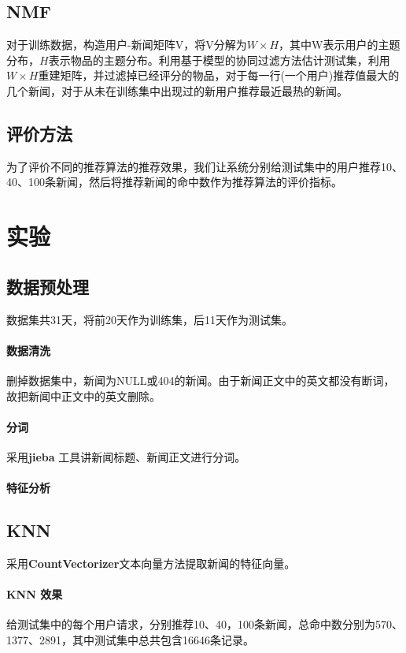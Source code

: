 \documentclass[UTF8]{article}
\begin{document}
\subsection{NMF}
对于训练数据，构造用户-新闻矩阵V，将V分解为$W\times H$，其中W表示用户的主题分布，$H$表示物品的主题分布。利用基于模型的协同过滤方法估计测试集，利用$W\times H$重建矩阵，并过滤掉已经评分的物品，对于每一行(一个用户)推荐值最大的几个新闻，对于从未在训练集中出现过的新用户推荐最近最热的新闻。

\subsection{评价方法}
为了评价不同的推荐算法的推荐效果，我们让系统分别给测试集中的用户推荐10、40、100条新闻，然后将推荐新闻的命中数作为推荐算法的评价指标。

\section{实验}
\subsection{数据预处理}
数据集共31天，将前20天作为训练集，后11天作为测试集。

\paragraph{数据清洗} 删掉数据集中，新闻为NULL或404的新闻。由于新闻正文中的英文都没有断词，故把新闻中正文中的英文删除。
\paragraph{分词} 采用\textbf{jieba} 工具讲新闻标题、新闻正文进行分词。
\paragraph{特征分析} 

\subsection{KNN}
采用\textbf{CountVectorizer}文本向量方法提取新闻的特征向量。

\paragraph{KNN 效果} 给测试集中的每个用户请求，分别推荐10、40，100条新闻，总命中数分别为570、1377、2891，其中测试集中总共包含16646条记录。
\end{document}
